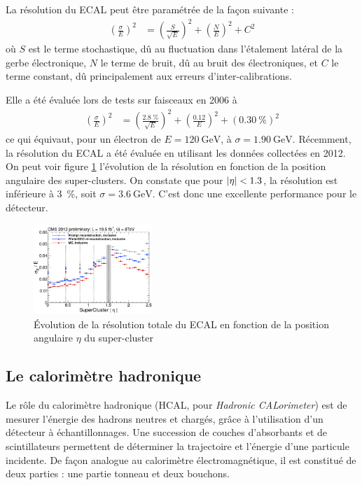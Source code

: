 \bigskip

La résolution du ECAL peut être paramétrée de la façon suivante :
\begin{align*}
  \left( \frac{\sigma}{E} \right)^2 &= \left( \frac{S}{\sqrt{E}} \right)^2 + \left( \frac{N}{E} \right)^2 + C^2
\end{align*}
où $S$ est le terme stochastique, dû au fluctuation dans l'étalement latéral de la gerbe électronique, $N$ le terme de bruit, dû au bruit des électroniques, et $C$ le terme constant, dû principalement aux erreurs d'inter-calibrations.

Elle a été évaluée lors de tests sur faisceaux en 2006 à
\begin{align*}
  \left( \frac{\sigma}{E} \right)^2 &= \left( \frac{\SI{2.8}{\%}}{\sqrt{E}} \right)^2 + \left( \frac{\num{0.12}}{E} \right)^2 + \left(\SI{0.30}{\%}\right)^2
\end{align*}
ce qui équivaut, pour un électron de $E = \SI{120}{\GeV}$, à $\sigma = \SI{1.90}{\GeV}$. Récemment, la résolution du ECAL a été évaluée en utilisant les données collectées en 2012. On peut voir figure \ref{fig:ecal_resolution} l'évolution de la résolution en fonction de la position angulaire des super-clusters. On constate que pour $\lvert \eta \rvert < 1.3$, la résolution est inférieure à \SI{3}{\%}, soit $\sigma = \SI{3.6}{\GeV}$. C'est donc une excellente performance pour le détecteur.

\begin{figure} \centering
  \includegraphics[width=0.4\textwidth]{chapitre2/figs/ecal_resolution.pdf}
  \caption{Évolution de la résolution totale du ECAL en fonction de la position angulaire $\eta$ du super-cluster}
  \label{fig:ecal_resolution}
\end{figure}

\subsection{Le calorimètre hadronique} \label{sec:hcal}

Le rôle du calorimètre hadronique (HCAL, pour \emph{Hadronic CALorimeter}) est de mesurer l'énergie des hadrons neutres et chargés, grâce à l'utilisation d'un détecteur à échantillonnages. Une succession de couches d'absorbants et de scintillateurs permettent de déterminer la trajectoire et l'énergie d'une particule incidente. De façon analogue au calorimètre électromagnétique, il est constitué de deux parties : une partie tonneau et deux bouchons.

